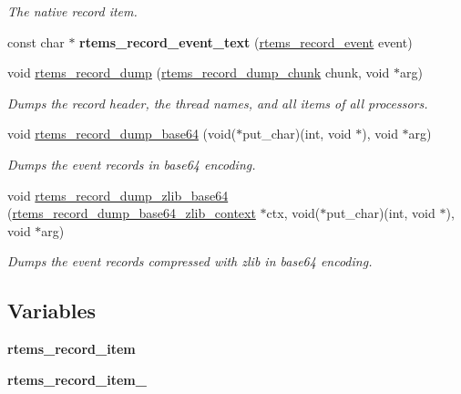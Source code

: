 \begin{DoxyCompactItemize}
\begin{DoxyCompactList}\small\item\em The native record item. \end{DoxyCompactList}\item 
\mbox{\label{group__RTEMSRecord_ga3d635055b23d1d272bf482482ef4be13}} 
const char $\ast$ {\bfseries rtems\+\_\+record\+\_\+event\+\_\+text} (\mbox{\hyperlink{group__RTEMSRecord_gac748f47c13acd7d0595694ed7f19074b}{rtems\+\_\+record\+\_\+event}} event)
\item 
void \mbox{\hyperlink{group__RTEMSRecord_gaaf0596e7f638ba4a1acbf1f7b1c9be4f}{rtems\+\_\+record\+\_\+dump}} (\mbox{\hyperlink{group__RTEMSRecord_gad5d67c09a47fe0f93067be3667db7ce0}{rtems\+\_\+record\+\_\+dump\+\_\+chunk}} chunk, void $\ast$arg)
\begin{DoxyCompactList}\small\item\em Dumps the record header, the thread names, and all items of all processors. \end{DoxyCompactList}\item 
void \mbox{\hyperlink{group__RTEMSRecord_gab6001739484c4535adaf515af6fc253a}{rtems\+\_\+record\+\_\+dump\+\_\+base64}} (void($\ast$put\+\_\+char)(int, void $\ast$), void $\ast$arg)
\begin{DoxyCompactList}\small\item\em Dumps the event records in base64 encoding. \end{DoxyCompactList}\item 
void \mbox{\hyperlink{group__RTEMSRecord_ga4b52b1b7fb56bf9b7884860e5dcc0134}{rtems\+\_\+record\+\_\+dump\+\_\+zlib\+\_\+base64}} (\mbox{\hyperlink{structrtems__record__dump__base64__zlib__context}{rtems\+\_\+record\+\_\+dump\+\_\+base64\+\_\+zlib\+\_\+context}} $\ast$ctx, void($\ast$put\+\_\+char)(int, void $\ast$), void $\ast$arg)
\begin{DoxyCompactList}\small\item\em Dumps the event records compressed with zlib in base64 encoding. \end{DoxyCompactList}\end{DoxyCompactItemize}
\subsection*{Variables}
\begin{DoxyCompactItemize}
\item 
\mbox{\label{group__RTEMSRecord_gacf8270f4bab07ef3c104b7d0d86cd7b0}} 
{\bfseries rtems\+\_\+record\+\_\+item}
\item 
\mbox{\label{group__RTEMSRecord_ga826962f7ce8c7a63d1822db90e288d6d}} 
{\bfseries rtems\+\_\+record\+\_\+item\+\_}
\end{DoxyCompactItemize}


